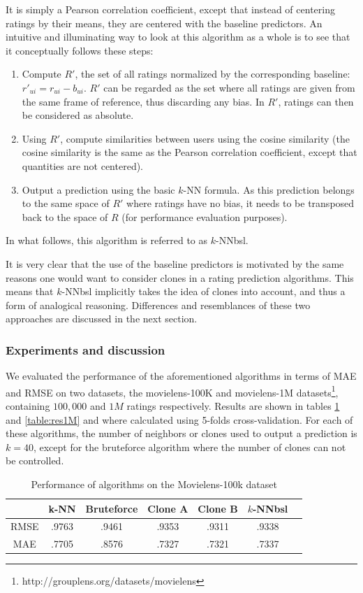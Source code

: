 It is simply a Pearson correlation coefficient, except that instead of
centering ratings by their means, they are centered with the baseline
predictors. An intuitive and illuminating way to look at this algorithm as a
whole is to see that it conceptually follows these steps:
\begin{enumerate}
  \item Compute $R'$, the set of all ratings normalized by the corresponding
    baseline: $r'_{ui} = r_{ui} - b_{ui}$.  $R'$ can be regarded as the set
    where all ratings are given from the same frame of reference, thus
    discarding any bias.  In $R'$, ratings can then be considered as absolute.
  \item Using $R'$, compute similarities between users using the cosine similarity (the
    cosine similarity is the same as the Pearson correlation coefficient,
    except that quantities are not centered).
  \item Output a prediction using the basic $k$-NN formula. As this prediction
    belongs to the same space of $R'$ where ratings have no bias, it needs to
    be transposed back to the space of $R$ (for performance evaluation
    purposes).
\end{enumerate}

In what follows, this algorithm is referred to as $k$-NNbsl.

It is very clear that the use of the baseline predictors is motivated by the
same reasons one would want to consider clones in a rating prediction
algorithms. This means that $k$-NNbsl implicitly takes the idea of clones into account, and thus a form of analogical reasoning.
Differences and resemblances of these two approaches are discussed
in the next section.

\subsubsection{Experiments and discussion}
\label{expeDiscuss}

We evaluated the performance of the aforementioned algorithms in terms of MAE
and RMSE on two datasets, the movielens-100K and movielens-1M
datasets\footnote{http://grouplens.org/datasets/movielens}, containing
$100,000$ and $1M$ ratings respectively. Results are shown in tables
\ref{table:res100k} and \ref{table:res1M} and where calculated using 5-folds
cross-validation. For each of these algorithms, the number of neighbors or
clones used to output a prediction is $k = 40$, except for the bruteforce
algorithm where the number of clones can not be controlled.
\begin{table}[!ht]
\centering
\caption{Performance of algorithms on the Movielens-100k dataset}
\label{table:res100k}
\begin{tabular}{| c || c | c | c | c | c | c |}
\toprule
     &  k-NN & Bruteforce & Clone A & Clone B & $k$-NNbsl\\
\midrule
RMSE & .9763 &   .9461    &   .9353 &  .9311  &  .9338   \\
MAE  & .7705 &   .8576    &   .7327 &  .7321  &  .7337   \\
\bottomrule
\end{tabular}
\end{table}

